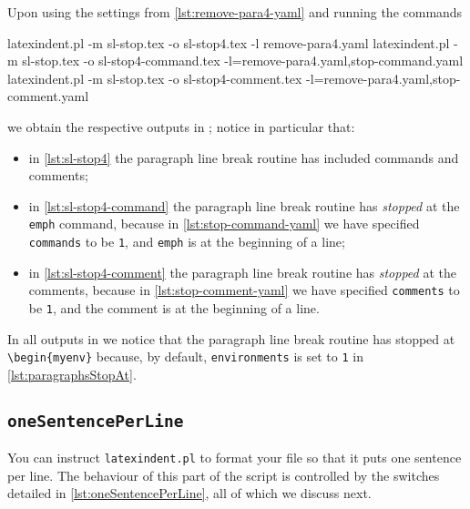 	Upon using the settings from \vref{lst:remove-para4-yaml} and running the commands \begin{widepage} \begin{commandshell}
latexindent.pl -m sl-stop.tex -o sl-stop4.tex -l remove-para4.yaml
latexindent.pl -m sl-stop.tex -o sl-stop4-command.tex -l=remove-para4.yaml,stop-command.yaml
latexindent.pl -m sl-stop.tex -o sl-stop4-comment.tex -l=remove-para4.yaml,stop-comment.yaml
    \end{commandshell} \end{widepage} we obtain the respective outputs in ; notice in particular that: \begin{itemize} \item in \cref{lst:sl-stop4} the paragraph line break routine has included commands and comments;
		\item in \cref{lst:sl-stop4-command} the paragraph line break routine has \emph{stopped} at the \texttt{emph} command, because in \cref{lst:stop-command-yaml} we have specified \texttt{commands} to be \texttt{1}, and \texttt{emph} is at the beginning of a line;
		\item in \cref{lst:sl-stop4-comment} the paragraph line break routine has \emph{stopped} at the comments, because in \cref{lst:stop-comment-yaml} we have specified \texttt{comments} to be \texttt{1}, and the comment is at the beginning of a line.
	\end{itemize}
	In all outputs in  we notice that the paragraph line break routine has stopped at \lstinline!\begin{myenv}! because, by default, \texttt{environments} is set to \texttt{1} in \vref{lst:paragraphsStopAt}.


\subsection{\texttt{oneSentencePerLine}}
	You can instruct \texttt{latexindent.pl} to format%
	 your file so that it puts one sentence per line.
	The behaviour of this part of the script is controlled by the switches detailed in \cref{lst:oneSentencePerLine}, all of which we discuss next.

